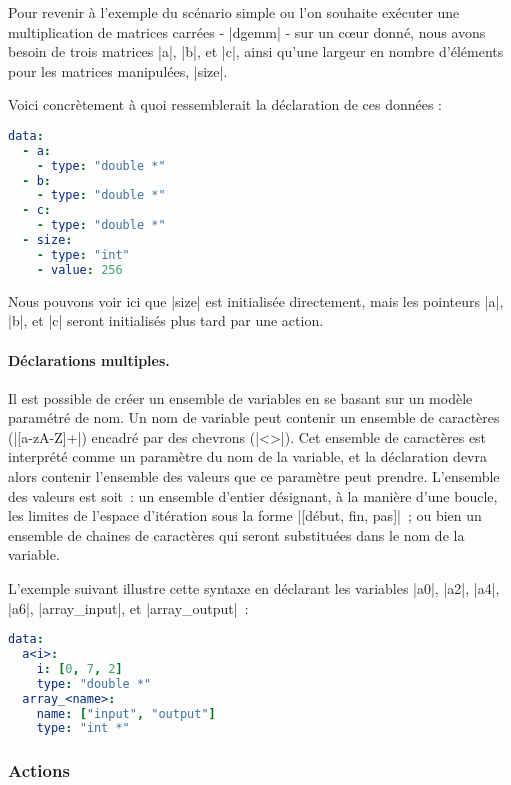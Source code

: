 Pour revenir à l'exemple du scénario simple ou l'on souhaite exécuter une multiplication de matrices carrées - |dgemm| - sur un cœur donné, nous avons besoin de trois matrices |a|, |b|, et |c|, ainsi qu'une largeur en nombre d'éléments pour les matrices manipulées, |size|.

Voici concrètement à quoi ressemblerait la déclaration de ces données :

\begin{lstlisting}[language=yaml,caption=Exemple de déclaration de variables,label=lst:tool:data-example]
data:
  - a:
    - type: "double *"
  - b:
    - type: "double *"
  - c:
    - type: "double *"
  - size:
    - type: "int"
    - value: 256
\end{lstlisting}

Nous pouvons voir ici que |size| est initialisée directement, mais les pointeurs |a|, |b|, et |c| seront initialisés plus tard par une action.

\paragraph{Déclarations multiples.}

Il est possible de créer un ensemble de variables en se basant sur un modèle paramétré de nom.
Un nom de variable peut contenir un ensemble de caractères (|[a-zA-Z]+|) encadré par des chevrons (|<>|).
Cet ensemble de caractères est interprété comme un paramètre du nom de la variable, et la déclaration devra alors contenir l'ensemble des valeurs que ce paramètre peut prendre.
L'ensemble des valeurs est soit~: un ensemble d'entier désignant, à la manière d'une boucle, les limites de l'espace d'itération sous la forme |[début, fin, pas]|~; ou bien un ensemble de chaines de caractères qui seront substituées dans le nom de la variable.

L'exemple suivant illustre cette syntaxe en déclarant les variables |a0|, |a2|, |a4|, |a6|, |array_input|, et |array_output|~:

\begin{lstlisting}[language=yaml,caption=Exemple de déclaration de variables paramètrées,label=lst:tool:data-example-for]
data:
  a<i>:
    i: [0, 7, 2]
    type: "double *"
  array_<name>:
    name: ["input", "output"]
    type: "int *"
\end{lstlisting}



\subsubsection{Actions}

